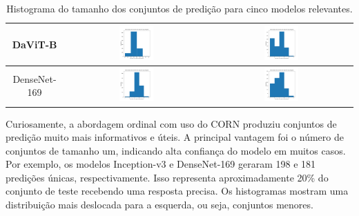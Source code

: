 \begin{table}[!htbp]
\begin{tabular}{|c|c|c|}
        DaViT-B & \includegraphics[width=0.25\textwidth]{figs/conformal_prediction/davit_base-msft_in1k_cp_cross_entropy.png} & \includegraphics[width=0.25\textwidth]{figs/conformal_prediction/davit_base-msft_in1k_cp_corn.png} \\ \hline
        DenseNet-169 & \includegraphics[width=0.25\textwidth]{figs/conformal_prediction/densenet169_cp_cross_entropy.png} & \includegraphics[width=0.25\textwidth]{figs/conformal_prediction/densenet169_cp_corn.png} \\ \hline
    \end{tabular}
    \caption{Histograma do tamanho dos conjuntos de predição para cinco modelos relevantes.}
    \label{tab:cp_set_sizes}
\end{table}

Curiosamente, a abordagem ordinal com uso do CORN produziu conjuntos de predição muito mais informativos e úteis. A principal vantagem foi o número de conjuntos de tamanho um, indicando alta confiança do modelo em muitos casos. Por exemplo, os modelos Inception-v3 e DenseNet-169 geraram 198 e 181 predições únicas, respectivamente. Isso representa aproximadamente 20\% do conjunto de teste recebendo uma resposta precisa. Os histogramas mostram uma distribuição mais deslocada para a esquerda, ou seja, conjuntos menores.

